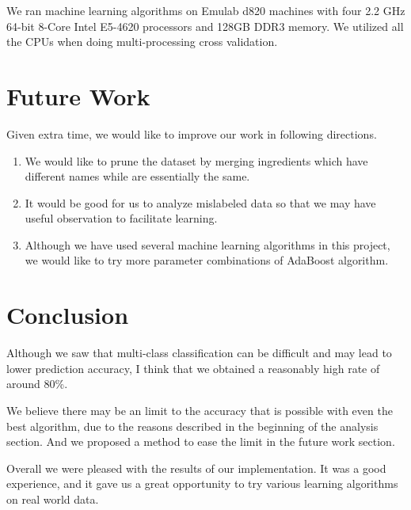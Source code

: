 \documentclass[11pt]{article}
\begin{document}
We ran machine learning algorithms on Emulab d820\cite{emulab-wiki}
machines with four 2.2 GHz 64-bit 8-Core Intel E5-4620 processors and
128GB DDR3 memory. We utilized all the CPUs when doing
multi-processing cross validation. 







\section{Future Work}
Given extra time, we would like to improve our work in following directions.
\begin{enumerate}
	\item We would like to prune the dataset by merging ingredients which have different names while are essentially the same. 
	\item It would be good for us to analyze mislabeled data so that we may have useful observation to facilitate learning.
	\item Although we have used several machine learning algorithms in this project, we would like to try more parameter combinations of AdaBoost algorithm.
\end{enumerate}

\section{Conclusion}
Although we saw that multi-class classification can be difficult and
may lead to lower prediction accuracy, I think that we obtained a
reasonably high rate of around 80\%.  

We believe there may be an limit to the accuracy that is possible with
even the best algorithm, due to the reasons described in the beginning of the analysis section. And we proposed a method to ease the limit in the future work section.


Overall we were pleased with the results of our implementation.  It
was a good experience, and it gave us a great opportunity to try
various learning algorithms on real world data.



\end{document}
